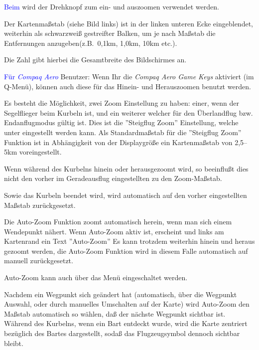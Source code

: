 \textcolor{blue}{Beim \al} wird der Drehknopf zum ein- und auszoomen verwendet werden.

Der Kartenmaßstab (siehe Bild links)  ist in der linken unteren Ecke eingeblendet, weiterhin als schwarzweiß 
gestreifter Balken, um je nach Maßstab die Entfernungen anzugeben(z.B.\ 0,1km, 1,0km, 10km etc.).

Die Zahl gibt hierbei die Gesamtbreite des Bildschirmes an.

\textcolor{blue}{Für \textsl{Compaq Aero}} Benutzer: Wenn Ihr die \textsl{Compaq Aero Game Keys} aktiviert (im Q-Menü), können auch diese für das Hinein- und Herauszoomen benutzt werden.

Es besteht die Möglichkeit, zwei Zoom Einstellung zu haben: einer, wenn der Segelflieger  beim Kurbeln ist, und ein weiterer welcher für den Überlandflug bzw. Endanflugmodus gültig ist.
Dies ist die ''Steigflug Zoom'' Einstellung, welche unter  eingestellt werden kann.
Als Standardmaßstab für die ''Steigflug Zoom'' Funktion ist in Abhängigkeit von der Displaygröße ein Kartenmaßstab von 2,5--5km voreingestellt.

Wenn während des Kurbelns hinein oder herausgezoomt wird,  so beeinflußt dies nicht den vorher im
Geradeausflug eingestellten zu den Zoom-Maßstab.

Sowie das Kurbeln beendet wird, wird automatisch auf  den vorher eingestellten Maßstab zurückgesetzt.

Die Auto-Zoom Funktion zoomt automatisch herein, wenn man sich einem Wendepunkt nähert. Wenn Auto-Zoom aktiv ist, erscheint und links am Kartenrand ein Text ''Auto-Zoom''
Es kann trotzdem weiterhin hinein und heraus gezoomt werden, 
die Auto-Zoom Funktion wird in diesem Falle automatisch auf manuell zurückgesetzt.


Auto-Zoom kann auch \"uber das Men\"u eingeschaltet werden.

Nachdem ein Wegpunkt sich geändert hat (automatisch, über die Wegpunkt Auswahl, oder durch manuelles Umschalten auf der Karte) wird Auto-Zoom den Maßstab automatisch so wählen, daß der nächste Wegpunkt sichtbar ist. Während des Kurbelns, wenn ein Bart entdeckt wurde, wird die Karte zentriert bezüglich des Bartes dargestellt, sodaß das Flugzeugsymbol dennoch sichtbar bleibt.

